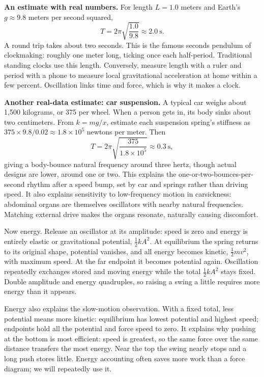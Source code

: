 \textbf{An estimate with real numbers.} For length \(L=1.0\) meters and Earth's \(g\approx9.8\) meters per second squared,
\[
  T=2\pi\sqrt{\frac{1.0}{9.8}}\approx 2.0\ \text{s}.
\]
A round trip takes about two seconds. This is the famous seconds pendulum of clockmaking: roughly one meter long, ticking once each half-period. Traditional standing clocks use this length. Conversely, measure length with a ruler and period with a phone to measure local gravitational acceleration at home within a few percent. Oscillation links time and force, which is why it makes a clock.

\textbf{Another real-data estimate: car suspension.} A typical car weighs about 1,500 kilograms, or 375 per wheel. When a person gets in, its body sinks about two centimeters. From \(k=mg/x\), estimate each suspension spring's stiffness as \(375\times9.8/0.02\approx1.8\times10^{5}\) newtons per meter. Then
\[
  T=2\pi\sqrt{\frac{375}{1.8\times10^{5}}}\approx 0.3\ \text{s},
\]
giving a body-bounce natural frequency around three hertz, though actual designs are lower, around one or two. This explains the one-or-two-bounces-per-second rhythm after a speed bump, set by car and springs rather than driving speed. It also explains sensitivity to low-frequency motion in carsickness: abdominal organs are themselves oscillators with nearby natural frequencies. Matching external drive makes the organs resonate, naturally causing discomfort.

Now energy. Release an oscillator at its amplitude: speed is zero and energy is entirely elastic or gravitational potential, \(\frac12 kA^{2}\). At equilibrium the spring returns to its original shape, potential vanishes, and all energy becomes kinetic, \(\frac12 mv^{2}\), with maximum speed. At the far endpoint it becomes potential again. Oscillation repeatedly exchanges stored and moving energy while the total \(\frac12 kA^{2}\) stays fixed. Double amplitude and energy quadruples, so raising a swing a little requires more energy than it appears.

Energy also explains the slow-motion observation. With a fixed total, less potential means more kinetic: equilibrium has lowest potential and highest speed; endpoints hold all the potential and force speed to zero. It explains why pushing at the bottom is most efficient: speed is greatest, so the same force over the same distance transfers the most energy. Near the top the swing nearly stops and a long push stores little. Energy accounting often saves more work than a force diagram; we will repeatedly use it.

